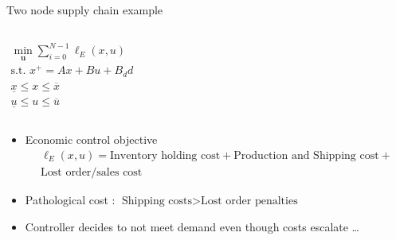 \documentclass[table]{beamer}
\newcommand\bu {\mathbf{u}}
\begin{document}
\begin{frame}[t]{Two node supply chain example}
\begin{columns}[T]
{\small{
\begin{gather*}
\min_{\bu} \sum_{i=0}^{N-1} \ell_E(x,u) \\
\text{s.t.~} x^+ = Ax + Bu + B_dd \\
\underline{x} \leq x \leq \overline{x} \\
\underline{u} \leq u \leq \overline{u}
\end{gather*}}}
\begin{figure}
   \centering
   \resizebox{1\columnwidth}{!}{}
  \end{figure}
\end{columns}
\begin{itemize}
\item \alert{Economic control objective}
{\small{\begin{multline*}\ell_E(x,u) = \text{Inventory holding cost}+ \text{Production and Shipping cost} +\\ \text{Lost order/sales cost} \end{multline*}}}
  \item Pathological cost : $ \text{Shipping costs} > \text{Lost order
      penalties}$ 
  \item \alert{Controller decides to not meet demand even though costs escalate \ldots} %
 \end{itemize}
\end{frame}
\end{document}
